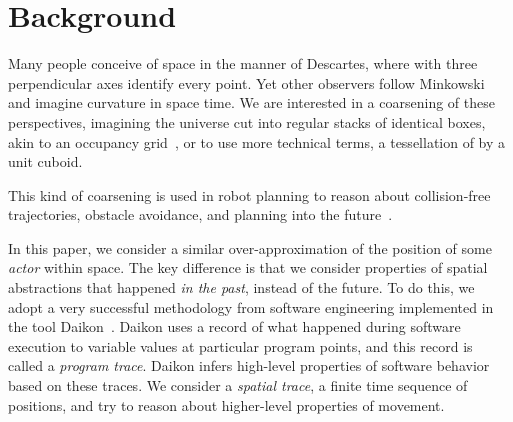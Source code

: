 \section{Background}
\label{sec:background}

Many people conceive of space in the manner of Descartes, where with three perpendicular axes identify every point.  
Yet other observers follow Minkowski~\cite{minkowski1952space} and imagine curvature in space time.
We are interested in a coarsening of these perspectives, imagining the universe cut into regular stacks of identical boxes, akin to an occupancy grid~\cite{moravec1985high}, or to use more technical terms, a tessellation of \rthree by a unit cuboid.



This kind of coarsening is used in robot planning to reason about collision-free trajectories, obstacle avoidance, and planning into the future~\cite{siegwart2011introduction}.

In this paper, we consider a similar over-approximation of the position of some \emph{actor} within space. 
The key difference is that we consider properties of spatial abstractions that happened \emph{in the past}, instead of the future.
To do this, we adopt a very successful methodology from software engineering implemented in the tool Daikon~\cite{kataoka2001automated}.
Daikon uses a record of what happened during software execution to variable values at particular program points, and this record is called a \emph{program trace}.  Daikon infers high-level properties of software behavior based on these traces.
We consider a \emph{spatial trace}, a finite time sequence of positions, and try to reason about higher-level properties of movement.


